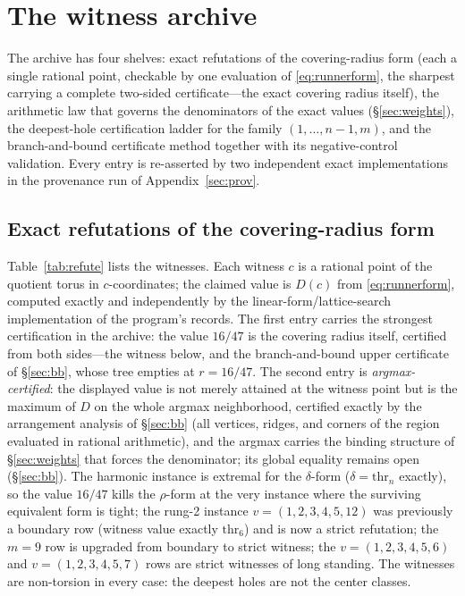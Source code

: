 
\section{The witness archive}\label{sec:witness}

The archive has four shelves: exact refutations of the covering-radius
form (each a single rational point, checkable by one evaluation of
\eqref{eq:runnerform}, the sharpest carrying a complete two-sided
certificate---the exact covering radius itself), the arithmetic law
that governs the denominators of the
exact values (\S\ref{sec:weights}), the deepest-hole certification
ladder for the family $(1,\dots,n{-}1,m)$, and the branch-and-bound
certificate method together with its negative-control validation. Every
entry is re-asserted by two independent exact implementations in the
provenance run of Appendix~\ref{sec:prov}.

\subsection{Exact refutations of the covering-radius form}

Table~\ref{tab:refute} lists the witnesses. Each witness $c$ is a
rational point of the quotient torus in $c$-coordinates; the claimed
value is $D(c)$ from \eqref{eq:runnerform}, computed exactly and
independently by the linear-form/lattice-search implementation of the
program's records. The first entry carries the strongest certification
in the archive: the value $16/47$ is the covering radius itself,
certified from both sides---the witness below, and the branch-and-bound
upper certificate of \S\ref{sec:bb}, whose tree empties at $r=16/47$.
The second entry is \emph{argmax-certified}: the displayed value is
not merely attained at the witness point but is the maximum of $D$ on
the whole argmax neighborhood, certified exactly by the arrangement
analysis of \S\ref{sec:bb} (all vertices, ridges, and corners of the
region evaluated in rational arithmetic), and the argmax carries the
binding structure of \S\ref{sec:weights} that forces the denominator;
its global equality remains open (\S\ref{sec:bb}).
The harmonic instance is extremal for the $\delta$-form
($\delta=\mathrm{thr}_n$ exactly), so the value $16/47$ kills the
$\rho$-form at the very instance where the surviving equivalent form is
tight; the rung-2 instance $v=(1,2,3,4,5,12)$ was previously a
boundary row (witness value exactly $\mathrm{thr}_6$) and is now a
strict refutation; the $m=9$ row is upgraded from boundary to strict
witness; the $v=(1,2,3,4,5,6)$ and $v=(1,2,3,4,5,7)$ rows are strict
witnesses of long standing. The witnesses are non-torsion in every
case: the deepest holes are not the center classes.

